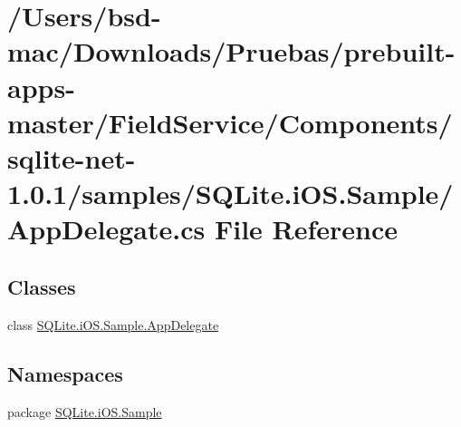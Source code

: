 \hypertarget{_components_2sqlite-net-1_80_81_2samples_2_s_q_lite_8i_o_s_8_sample_2_app_delegate_8cs}{\section{/\+Users/bsd-\/mac/\+Downloads/\+Pruebas/prebuilt-\/apps-\/master/\+Field\+Service/\+Components/sqlite-\/net-\/1.0.1/samples/\+S\+Q\+Lite.i\+O\+S.\+Sample/\+App\+Delegate.cs File Reference}
\label{_components_2sqlite-net-1_80_81_2samples_2_s_q_lite_8i_o_s_8_sample_2_app_delegate_8cs}
}
\subsection*{Classes}
\begin{DoxyCompactItemize}
\item 
class \hyperlink{class_s_q_lite_1_1i_o_s_1_1_sample_1_1_app_delegate}{S\+Q\+Lite.\+i\+O\+S.\+Sample.\+App\+Delegate}
\end{DoxyCompactItemize}
\subsection*{Namespaces}
\begin{DoxyCompactItemize}
\item 
package \hyperlink{namespace_s_q_lite_1_1i_o_s_1_1_sample}{S\+Q\+Lite.\+i\+O\+S.\+Sample}
\end{DoxyCompactItemize}
